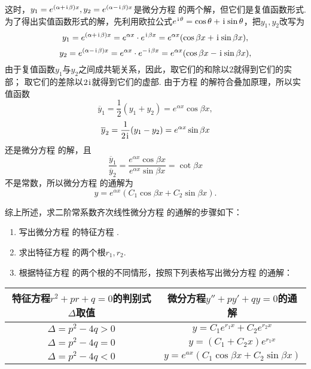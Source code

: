 \begin{enumerate}
这时，\(y_1 = e^{(\alpha+\kern1pt\mathrm{i}\kern1pt\beta)x}, y_2 = e^{(\alpha-\kern1pt\mathrm{i}\kern1pt\beta)x}\)是微分方程  的两个解，但它们是复值函数形式.
为了得出实值函数形式的解，先利用欧拉公式\(e^{\kern1pt\mathrm{i}\kern1pt\theta} = \cos\theta+\kern1pt\mathrm{i}\kern1pt\sin\theta\)，把\(y_1,y_2\)改写为\[
y_1 = e^{(\alpha+\kern1pt\mathrm{i}\kern1pt\beta)x} = e^{\alpha x} \cdot e^{\kern1pt\mathrm{i}\kern1pt\beta x}
= e^{\alpha x} (\cos\beta x + \kern1pt\mathrm{i}\kern1pt \sin\beta x),
\]\[
y_2 = e^{(\alpha-\kern1pt\mathrm{i}\kern1pt\beta)x} = e^{\alpha x} \cdot e^{-\kern1pt\mathrm{i}\kern1pt\beta x}
= e^{\alpha x} (\cos\beta x - \kern1pt\mathrm{i}\kern1pt \sin\beta x),
\]由于复值函数\(y_1\)与\(y_2\)之间成共轭关系，因此，取它们的和除以\(2\)就得到它们的实部；
取它们的差除以\(2\kern1pt\mathrm{i}\kern1pt\)就得到它们的虚部.
由于方程  的解符合叠加原理，所以实值函数\[
\overline{y}_1 = \frac{1}{2} (y_1 + y_2) = e^{\alpha x} \cos\beta x,
\]\[
\overline{y}_2 = \frac{1}{2\kern1pt\mathrm{i}\kern1pt} (y_1 - y_2) = e^{\alpha x} \sin\beta x
\]还是微分方程  的解，且\[
\frac{\overline{y}_1}{\overline{y}_2}
= \frac{e^{\alpha x} \cos\beta x}{e^{\alpha x} \sin\beta x}
= \cot\beta x
\]不是常数，所以微分方程  的通解为\[
y = e^{\alpha x} (C_1 \cos\beta x + C_2 \sin\beta x).
\]
\end{enumerate}

综上所述，求二阶常系数齐次线性微分方程  的通解的步骤如下：
\begin{enumerate}
\item
写出微分方程  的特征方程 .

\item
求出特征方程  的两个根\(r_1,r_2\).

\item
根据特征方程  的两个根的不同情形，按照下列表格写出微分方程  的通解：
\end{enumerate}

\begin{center}
\begin{tabular}{c|c}
\hline
特征方程\(r^2+pr+q=0\)的判别式\(\Delta\)取值 & 微分方程\(y''+py'+qy = 0\)的通解 \\ \hline
\(\Delta = p^2 - 4q > 0\) & \(y = C_1 e^{r_1 x} + C_2 e^{r_2 x}\) \\
\(\Delta = p^2 - 4q = 0\) & \(y = (C_1 + C_2 x) e^{r_1 x}\) \\
\(\Delta = p^2 - 4q < 0\) & \(y = e^{ax} (C_1 \cos{\beta x} + C_2 \sin{\beta x})\) \\ \hline
\end{tabular}
\end{center}

